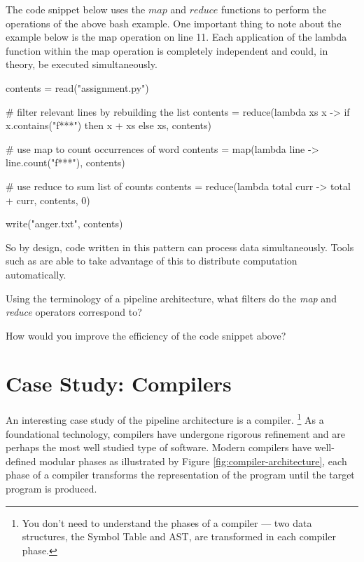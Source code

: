 The code snippet below uses the $map$ and $reduce$ functions
to perform the operations of the above bash example.
One important thing to note about the example below is the map operation on line 11.
Each application of the lambda function within the map operation is completely independent and could,
in theory, be executed simultaneously. 

\begin{code}[language=python,literate={{->}{{$\to$}}{2}{lambda}{{$\lambda$}}{1}},morekeywords={then}]{}
contents = read("assignment.py")

# filter relevant lines by rebuilding the list
contents = reduce(lambda xs x -> 
                    if x.contains("f***")
                        then x + xs
                        else xs,
                  contents)

# use map to count occurrences of word
contents = map(lambda line -> line.count("f***"), contents)

# use reduce to sum list of counts
contents = reduce(lambda total curr -> total + curr, contents, 0)

write("anger.txt", contents)
\end{code}

So by design, code written in this pattern can process data simultaneously.
Tools such as  are able to take advantage of this to distribute computation automatically.

\begin{extra}
Using the terminology of a pipeline architecture, what filters do the \textsl{map} and \textsl{reduce} operators correspond to?
\end{extra}

\begin{extra}
How would you improve the efficiency of the code snippet above?
\end{extra}

\section{Case Study: Compilers}

An interesting case study of the pipeline architecture is a compiler.%
\footnote{You don't need to understand the phases of a compiler --- two data structures, the Symbol Table and AST, are transformed in each compiler phase.}
As a foundational technology, compilers have undergone rigorous refinement and are perhaps the most well studied type of software.
Modern compilers have well-defined modular phases as illustrated by Figure \ref{fig:compiler-architecture},
each phase of a compiler transforms the representation of the program until the target program is produced.

